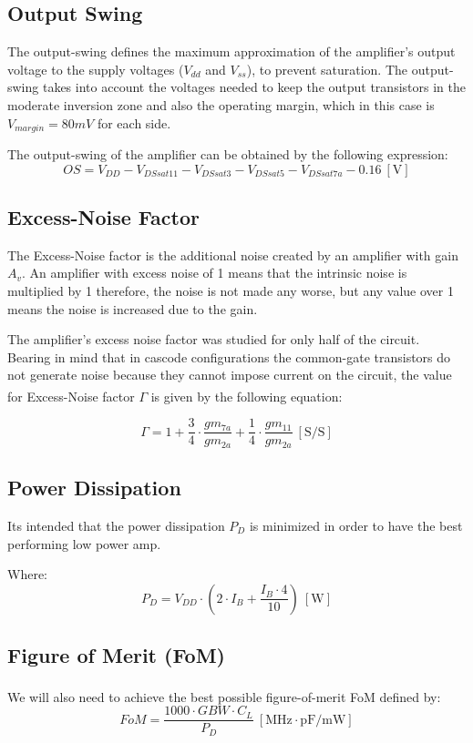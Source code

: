 \subsection{Output Swing}
The output-swing defines the maximum approximation of the amplifier's output voltage to the supply voltages ($V_{dd}$ and $V_{ss}$), to prevent saturation. The output-swing takes into account the voltages needed to keep the output transistors in the moderate inversion zone and also the operating margin, which in this case is $V_{margin}=80mV$ for each side.

The output-swing of the amplifier can be obtained by the following expression:
\begin{equation}
    OS = V_{DD} - V_{DSsat11} - V_{DSsat3} - V_{DSsat5} - V_{DSsat7a} - 0.16 \ [\si{\volt}]
    \label{eq:OS}
\end{equation}

\subsection{Excess-Noise Factor}
The Excess-Noise factor is the additional noise created by an amplifier with gain $A_v$. An amplifier with excess noise of 1 means that the intrinsic noise is multiplied by 1 therefore, the noise is not made any worse, but any value over 1 means the noise is increased due to the gain.

The amplifier's excess noise factor was studied for only half of the circuit. Bearing in mind that in cascode configurations the common-gate transistors do not generate noise because they cannot impose current on the circuit, the value for Excess-Noise factor $\Gamma$ is given by the following equation\textsuperscript{\cite{artigo-prof}}:

\begin{equation}
    \Gamma = 1 + \frac{3}{4}\cdot \frac{gm_{7a}}{gm_{2a}} + \frac{1}{4}\cdot \frac{gm_{11}}{gm_{2a}} \ [\si{\siemens / \siemens}]
    \label{eq:ENF}
\end{equation}


\subsection{Power Dissipation}

Its intended that the power dissipation $P_D$ is minimized in order to have the best performing low power amp.

Where: 
\begin{equation}
    P_D = V_{DD} \cdot \left(2 \cdot I_B + \dfrac{I_B\cdot 4}{10}\right) \ [\si{\watt}]
    \label{eq:PD}
\end{equation}

\subsection{Figure of Merit (FoM)}
 We will also need to achieve the best possible figure-of-merit FoM defined by\textsuperscript{\cite{Lab-statement}}: 
\begin{equation}
    FoM = \frac{1000 \cdot GBW \cdot C_L}{P_D} \ [\si{\mega\hertz}\cdot\si{\pico\farad/\milli\watt}]
    \label{eq:FoM}
\end{equation}